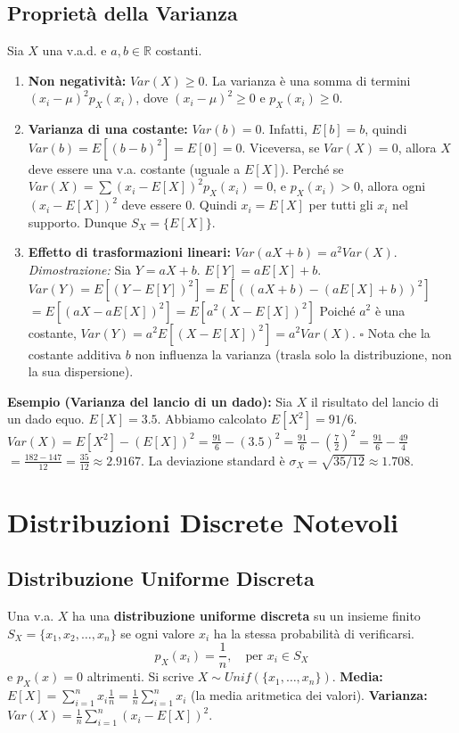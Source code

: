 \subsection{Proprietà della Varianza}
Sia $X$ una v.a.d. e $a, b \in \mathbb{R}$ costanti.
\begin{enumerate}
    \item \textbf{Non negatività:} $Var(X) \ge 0$.
    La varianza è una somma di termini $(x_i-\mu)^2 p_X(x_i)$, dove $(x_i-\mu)^2 \ge 0$ e $p_X(x_i) \ge 0$.
    \item \textbf{Varianza di una costante:} $Var(b) = 0$.
    Infatti, $E[b]=b$, quindi $Var(b) = E[(b-b)^2] = E[0] = 0$.
    Viceversa, se $Var(X)=0$, allora $X$ deve essere una v.a. costante (uguale a $E[X]$).
    Perché se $Var(X) = \sum (x_i - E[X])^2 p_X(x_i) = 0$, e $p_X(x_i)>0$, allora ogni $(x_i - E[X])^2$ deve essere 0. Quindi $x_i = E[X]$ per tutti gli $x_i$ nel supporto. Dunque $S_X=\{E[X]\}$.
    \item \textbf{Effetto di trasformazioni lineari:} $Var(aX + b) = a^2 Var(X)$.
    \textit{Dimostrazione:}
    Sia $Y = aX+b$. $E[Y] = aE[X]+b$.
    $Var(Y) = E[(Y - E[Y])^2] = E[((aX+b) - (aE[X]+b))^2]$
    $= E[(aX - aE[X])^2] = E[a^2(X - E[X])^2]$
    Poiché $a^2$ è una costante, $Var(Y) = a^2 E[(X - E[X])^2] = a^2 Var(X)$. $\square$
    Nota che la costante additiva $b$ non influenza la varianza (trasla solo la distribuzione, non la sua dispersione).
\end{enumerate}

\begin{example}
\textbf{Esempio (Varianza del lancio di un dado):}
Sia $X$ il risultato del lancio di un dado equo. $E[X] = 3.5$.
Abbiamo calcolato $E[X^2] = 91/6$.
$Var(X) = E[X^2] - (E[X])^2 = \frac{91}{6} - (3.5)^2 = \frac{91}{6} - (\frac{7}{2})^2 = \frac{91}{6} - \frac{49}{4}$
$= \frac{182 - 147}{12} = \frac{35}{12} \approx 2.9167$.
La deviazione standard è $\sigma_X = \sqrt{35/12} \approx 1.708$.
\end{example}

\section{Distribuzioni Discrete Notevoli}

\subsection{Distribuzione Uniforme Discreta}
Una v.a. $X$ ha una \textbf{distribuzione uniforme discreta} su un insieme finito $S_X = \{x_1, x_2, \dots, x_n\}$ se ogni valore $x_i$ ha la stessa probabilità di verificarsi.
\[ p_X(x_i) = \frac{1}{n}, \quad \text{per } x_i \in S_X \]
e $p_X(x)=0$ altrimenti. Si scrive $X \sim Unif(\{x_1, \dots, x_n\})$.
\textbf{Media:} $E[X] = \sum_{i=1}^n x_i \frac{1}{n} = \frac{1}{n} \sum_{i=1}^n x_i$ (la media aritmetica dei valori).
\textbf{Varianza:} $Var(X) = \frac{1}{n} \sum_{i=1}^n (x_i - E[X])^2$.

